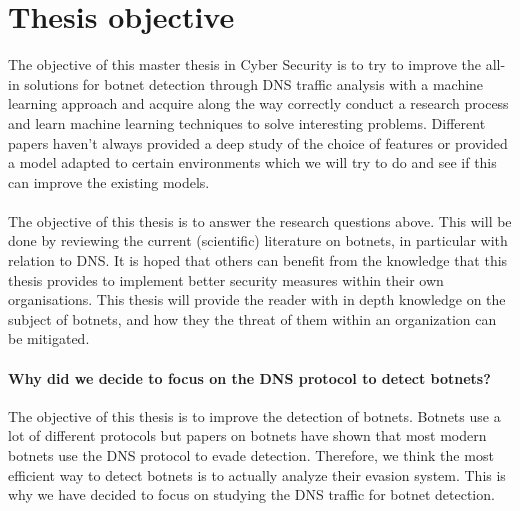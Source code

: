 \section{Thesis objective}
The objective of this master thesis in Cyber Security is to try to improve the all-in solutions for botnet detection through DNS traffic analysis with a machine learning approach and acquire along the way correctly conduct a research process and learn machine learning techniques to solve interesting problems. Different papers haven't always provided a deep study of the choice of features or provided a model adapted to certain environments which we will try to do and see if this can improve the existing models.\\
\\

The objective of this thesis is to answer the research questions above. This will be done by reviewing the current (scientific) literature on botnets, in particular with relation to DNS. It is hoped that others can benefit from the knowledge that this thesis provides to implement better security measures within their own organisations. This thesis will provide the reader with in depth knowledge on the subject of botnets, and how they the threat of them within an organization can be mitigated.
\\

\paragraph{Why did we decide to focus on the DNS protocol to detect botnets?}
The objective of this thesis is to improve the detection of botnets. Botnets use a lot of different protocols but papers on botnets have shown that most modern botnets use the DNS protocol to evade detection. Therefore, we think the most efficient way to detect botnets is to actually analyze their evasion system. This is why we have decided to focus on studying the DNS traffic for botnet detection.


